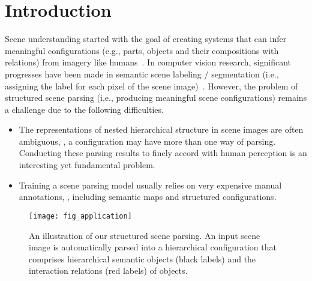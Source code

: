\documentclass[10pt,twocolumn,letterpaper]{article}
\begin{document}
\section{Introduction}

Scene understanding started with the goal of creating systems that can infer meaningful configurations (e.g., parts, objects and their compositions with relations) from imagery like humans~\cite{DBLP:ImageParsing-Attribute}. In computer vision research, significant progresses have been made in semantic scene labeling / segmentation (i.e., assigning the label for each pixel of the scene image)~\cite{DBLP:SemanSeg-1}\cite{DBLP:SemanSeg-3}\cite{DBLP:FCnetwork}\cite{DBLP:RecursiveContext}. However, the problem of structured scene parsing (i.e., producing meaningful scene configurations) remains a challenge due to the following difficulties.

\begin{itemize}

\item The representations of nested hierarchical structure in scene images are often ambiguous, \eg, a configuration may have more than one way of parsing. Conducting these parsing results to finely accord with human perception is an interesting yet fundamental problem.



\item Training a scene parsing model usually relies on very expensive manual annotations, \eg, including semantic maps and structured configurations.

\end{itemize}

\begin{figure}[t]
\centering
\texttt{[image: fig\_application]}
\caption{An illustration of our structured scene parsing. An input scene image is automatically parsed into a hierarchical configuration that comprises hierarchical semantic objects (black labels) and the interaction relations (red labels) of objects.}
\label{fig:application}
\vspace{-4mm}
\end{figure}
\end{document}
